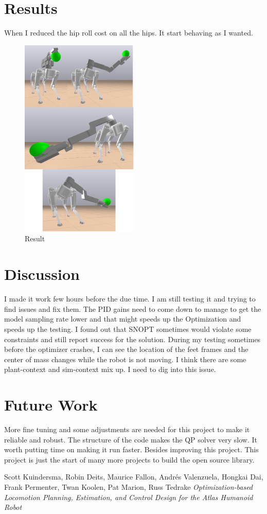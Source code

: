 \documentclass[conference]{IEEEtran}
\begin{document}
\section{Results}
When I reduced the hip roll cost on all the hips. It start behaving as I wanted.
\begin{figure}
    \includegraphics[width=0.5\textwidth]{figures/result.png}
    \caption{Result}
    \label{fig:result}
\end{figure}
\section{Discussion}
I made it work few hours before the due time. I am still testing it and trying to find issues and fix them.
The PID gains need to come down to manage to get the model sampling rate lower and that might speeds up the Optimization
and speeds up the testing.
I found out that SNOPT sometimes would violate some constraints and still report success for the solution.
During my testing sometimes before the optimizer crashes, I can see the location of the feet frames and the center of mass changes
while the robot is not moving. I think there are some plant-context and sim-context mix up. I need to dig into this issue.

\section{Future Work}
More fine tuning and some adjustments are needed for this project to make it reliable and robust. The structure of the code 
makes the QP solver very slow. It worth putting time on making it run faster.
Besides improving this project. This project is just the start of many more projects to build the open source library.

\begin{thebibliography}{}
    Scott Kuindersma, Robin Deits, Maurice Fallon, Andr\'{e}s Valenzuela, Hongkai Dai, 
    Frank Permenter, Twan Koolen, Pat Marion, Russ Tedrake 
    \emph{Optimization-based Locomotion Planning, Estimation, and Control Design for the Atlas Humanoid Robot}
\end{thebibliography}
\end{document}
